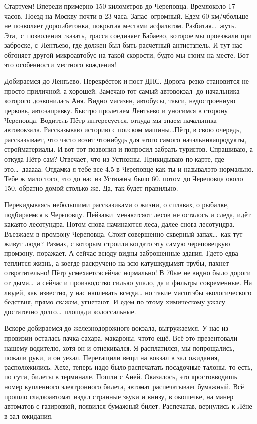 Стартуем! Впереди примерно 150 километров до Череповца. Время\mdash около 17 часов. Поезд на Москву почти в 23 часа. Запас~огромный. Едем 60 км/ч\mdash больше не позволяет дорога\mdash бетонка, покрытая местами асфальтом. Разбитая\ldots~жуть. Эта,~с~позволения сказать, трасса соединяет Бабаево, которое мы проезжали при заброске, с~Лентьево, где должен был быть расчетный антистапель. И тут нас обгоняет другой микроавтобус на такой скорости, будто мы стоим на месте. Вот это особенности местного вождения! 

Добираемся до Лентьево. Перекрёсток и пост ДПС. Дорога~резко становится не просто приличной, а хорошей. Замечаю тот самый автовокзал, до начальника которого дозвонилась Аня. Видно магазин, автобусы, такси, недостроенную церковь, автозаправку. Быстро пролетаем Лентьево и уносимся в сторону Череповца. Водитель Пётр интересуется, откуда мы знаем начальника автовокзала. Рассказываю историю с поиском машины\ldots Пётр, в свою очередь, рассказывает, что часто возит что\sdash нибудь для этого самого начальника\mdash продукты, стройматериалы. И вот тот позвонил и попросил забрать туристов. Спрашиваю, а откуда Пётр сам? Отвечает, что из Устюжны. Прикидываю по карте, где это\ldots~да\sdash а\sdash а\sdash а\sdash а. Отдам\sdash ка я тебе все 4.5 в Череповце как ты и называл\mdash это нормально. Тебе ж мало того, что до нас из Устюжны было 60, потом до Череповца около 150, обратно домой столько же. Да, так будет правильно. 

Перекидываясь небольшими рассказиками о жизни, о сплавах, о рыбалке, подбираемся к Череповцу. Пейзажи~меняются\mdash от лесов не осталось и следа, идёт какая\sdash то лесотундра. Потом снова начинаются леса, далее снова лесотундра. Въезжаем в промзону Череповца. Стоит совершенно скверный запах\ldots~как тут живут люди? Размах, с которым строили когда\sdash то эту самую череповецкую промзону, поражает. А сейчас всюду видны заброшенные здания. Где\sdash то едва теплится жизнь, а кое\sdash где раскручено на всю катушку\mdash дымят трубы, пахнет отвратительно! Пётр усмехается\mdash сейчас нормально! В 70\sdash ые не видно было дороги от дыма\ldots~а сейчас и производство сильно упало, да и фильтры современные. На людей, как известно, у нас наплевать всегда… но такие масштабы экологического бедствия, прямо скажем, угнетают. И едем по этому химическому ужасу достаточно долго\ldots~площади колоссальные.

Вскоре добираемся до железнодорожного вокзала, выгружаемся. У нас из провизии осталась пачка сахара, макароны, что\sdash то ещё. Всё это презентовали нашему водителю, хотя он и отнекивался. Я расплатился, мы попрощались, пожали руки, и он уехал. Перетащили вещи на вокзал в зал ожидания, расположились. Хе\sdash хе, теперь надо было распечатать посадочные талоны, то есть, по сути, билеты в терминале. Пошли с Аней. Оказалось, это просто\mdash вводишь номер купленного электронного билета, автомат распечатывает бумажный. Всё прошло гладко\mdash автомат издал странные звуки и внизу, в окошечке, на манер автоматов с газировкой, появился бумажный билет. Распечатав, вернулись к Лёне в зал ожидания. 

